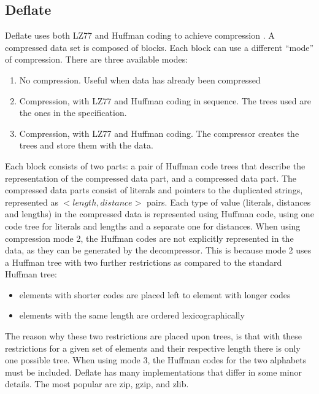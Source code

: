 \subsection{Deflate}
Deflate uses both LZ77 and Huffman coding to achieve compression \cite{LPeterDeutsch1996DEFLATE}. 
A compressed data set is composed of blocks. Each block can use a
different “mode” of compression. There are three available modes:
\begin{enumerate}
    \item No compression. Useful when data has already been compressed
    \item Compression, with LZ77 and Huffman coding in sequence. The trees
    used are the ones in the specification.
    \item Compression, with LZ77 and Huffman coding. The compressor
    creates the trees and store them with the data.
\end{enumerate}
Each block consists of two parts: a pair of Huffman code trees that describe the
representation of the compressed data part, and a compressed data part. The compressed
data parts consist of literals and pointers to the duplicated strings, represented as
$<length, distance>$ pairs. Each type of value (literals, distances and lengths) in the
compressed data is represented using Huffman code, using one code tree for literals and
lengths and a separate one for distances. When using compression mode 2, the Huffman codes
are not explicitly represented in the data, as they can be generated by the decompressor.
This is because mode 2 uses a Huffman tree with two further restrictions as compared to
the standard Huffman tree:
\begin{itemize}
    \item elements with shorter codes are placed left to element with longer codes
    \item elements with the same length are ordered lexicographically
\end{itemize}
The reason why these two restrictions are placed upon trees, is that with these restrictions
for a given set of elements and their respective length there is only one possible tree.
When using mode 3, the Huffman codes for the two alphabets must be included. Deflate has
many implementations that differ in some minor details. The most popular are zip, gzip, and
zlib.

